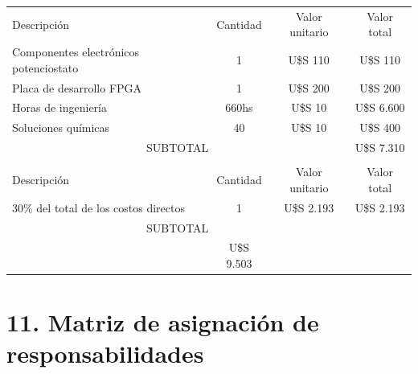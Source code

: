 \documentclass[11pt]{charter}
\begin{document}
\begin{table}[htpb]
\centering
\begin{tabularx}{\linewidth}{@{}|X|c|r|r|@{}}
\hline
\rowcolor[HTML]{C0C0C0} 
\multicolumn{4}{|c|}{\cellcolor[HTML]{C0C0C0}COSTOS DIRECTOS} \\ \hline
\rowcolor[HTML]{C0C0C0} 
Descripción &
  \multicolumn{1}{c|}{\cellcolor[HTML]{C0C0C0}Cantidad} &
  \multicolumn{1}{c|}{\cellcolor[HTML]{C0C0C0}Valor unitario} &
  \multicolumn{1}{c|}{\cellcolor[HTML]{C0C0C0}Valor total} \\ \hline
Componentes electrónicos potenciostato & 
  \multicolumn{1}{c|}{1} & 
  \multicolumn{1}{c|}{U\$S 110} &
  \multicolumn{1}{c|}{U\$S 110} \\ \hline
Placa de desarrollo FPGA &
  \multicolumn{1}{c|}{1} &
  \multicolumn{1}{c|}{U\$S 200} &
  \multicolumn{1}{c|}{U\$S 200} \\ \hline
Horas de ingeniería &
  \multicolumn{1}{c|}{660hs} &
  \multicolumn{1}{c|}{U\$S 10} &
  \multicolumn{1}{c|}{U\$S 6.600} \\ \hline
Soluciones químicas &  
  \multicolumn{1}{c|}{40} &
  \multicolumn{1}{c|}{U\$S 10} &
  \multicolumn{1}{c|}{U\$S 400} \\ \hline 
\multicolumn{3}{|c|}{SUBTOTAL} &
  \multicolumn{1}{c|}{U\$S 7.310} \\ \hline
\rowcolor[HTML]{C0C0C0} 
\hline
\multicolumn{4}{|c|}{\cellcolor[HTML]{C0C0C0}COSTOS INDIRECTOS} \\ \hline
\rowcolor[HTML]{C0C0C0} 
Descripción &
  \multicolumn{1}{c|}{\cellcolor[HTML]{C0C0C0}Cantidad} &
  \multicolumn{1}{c|}{\cellcolor[HTML]{C0C0C0}Valor unitario} &
  \multicolumn{1}{c|}{\cellcolor[HTML]{C0C0C0}Valor total} \\ \hline
30\% del total de los costos directos &
  \multicolumn{1}{c|}{1} &
  \multicolumn{1}{c|}{U\$S 2.193} &
  \multicolumn{1}{c|}{U\$S 2.193} \\ \hline 
\multicolumn{3}{|c|}{SUBTOTAL} &
  \multicolumn{1}{c|}{} \\ \hline
\rowcolor[HTML]{C0C0C0}
\multicolumn{3}{|c|}{TOTAL} &
 U\$S 9.503  \\ \hline
\end{tabularx}%
\end{table}


\section{11. Matriz de asignación de responsabilidades}
\label{sec:responsabilidades}
\end{document}
